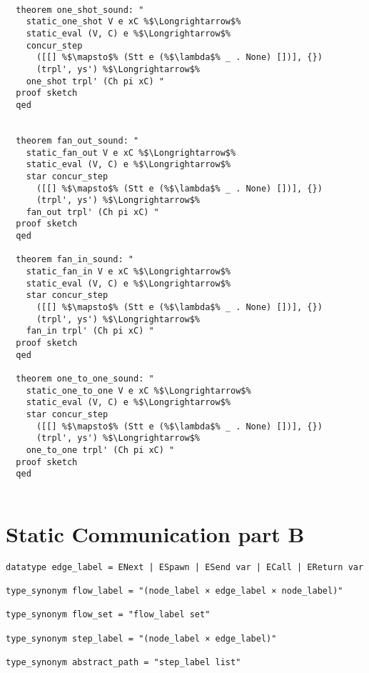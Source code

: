 \documentclass{article}
\begin{document}
\begin{lstlisting}[style=codestyle1, escapechar=\%]

  theorem one_shot_sound: "
    static_one_shot V e xC %$\Longrightarrow$%
    static_eval (V, C) e %$\Longrightarrow$%
    concur_step
      ([[] %$\mapsto$% (Stt e (%$\lambda$% _ . None) [])], {})
      (trpl', ys') %$\Longrightarrow$%
    one_shot trpl' (Ch pi xC) " 
  proof sketch
  qed


  theorem fan_out_sound: "
    static_fan_out V e xC %$\Longrightarrow$%
    static_eval (V, C) e %$\Longrightarrow$%
    star concur_step
      ([[] %$\mapsto$% (Stt e (%$\lambda$% _ . None) [])], {})
      (trpl', ys') %$\Longrightarrow$%
    fan_out trpl' (Ch pi xC) " 
  proof sketch
  qed

  theorem fan_in_sound: "
    static_fan_in V e xC %$\Longrightarrow$%
    static_eval (V, C) e %$\Longrightarrow$%
    star concur_step
      ([[] %$\mapsto$% (Stt e (%$\lambda$% _ . None) [])], {})
      (trpl', ys') %$\Longrightarrow$%
    fan_in trpl' (Ch pi xC) "
  proof sketch
  qed

  theorem one_to_one_sound: "
    static_one_to_one V e xC %$\Longrightarrow$%
    static_eval (V, C) e %$\Longrightarrow$%
    star concur_step
      ([[] %$\mapsto$% (Stt e (%$\lambda$% _ . None) [])], {})
      (trpl', ys') %$\Longrightarrow$%
    one_to_one trpl' (Ch pi xC) "
  proof sketch
  qed


  \end{lstlisting}



\section{Static Communication part B}

\begin{lstlisting}[style=codestyle1, escapechar=\%]
datatype edge_label = ENext | ESpawn | ESend var | ECall | EReturn var

type_synonym flow_label = "(node_label × edge_label × node_label)"

type_synonym flow_set = "flow_label set"

type_synonym step_label = "(node_label × edge_label)"

type_synonym abstract_path = "step_label list"
  \end{lstlisting}
\end{document}
